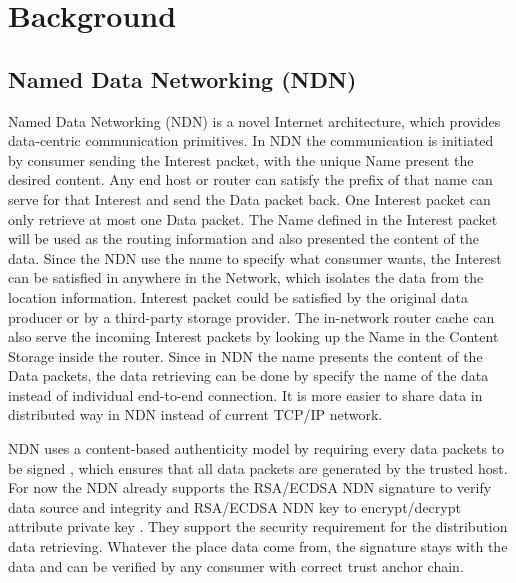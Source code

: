 \section{Background}

\subsection{Named Data Networking (NDN)}
Named Data Networking (NDN) \cite{zhang2014named} is a novel Internet architecture, which provides data-centric communication primitives. In NDN the communication is initiated by consumer sending the Interest packet, with the unique Name present the desired content. Any end host or router can satisfy the prefix of that name can serve for that Interest and send the Data packet back. One Interest packet can only retrieve at most one Data packet. The Name defined in the Interest packet will be used as the routing information and also presented the content of the data. Since the NDN use the name to specify what consumer wants, the Interest can be satisfied in anywhere in the Network, which isolates the data from the location information. Interest packet could be satisfied by the original data producer or by a third-party storage provider. The in-network router cache can also serve the incoming Interest packets by looking up the Name in the Content Storage inside the router. Since in NDN the name presents the content of the Data packets, the data retrieving can be done by specify the name of the data instead of individual end-to-end connection. It is more easier to share data in distributed way in NDN instead of current TCP/IP network.

NDN uses a content-based authenticity model by requiring every data packets to be signed \cite{yu2015name}, which ensures that all data packets are generated by the trusted host. For now the NDN already supports the RSA/ECDSA NDN signature to verify data source and integrity and RSA/ECDSA NDN key to encrypt/decrypt attribute private key \cite{afanasyev2016content}. They support the security requirement for the distribution data retrieving. Whatever the place data come from, the signature stays with the data and can be verified by any consumer with correct trust anchor chain.

